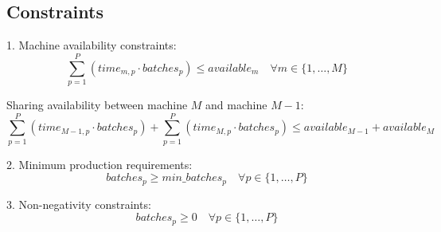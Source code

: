 \documentclass{article}
\begin{document}
\subsection*{Constraints}
1. Machine availability constraints:
\[
\sum_{p=1}^{P} (time_{m,p} \cdot batches_{p}) \leq available_{m} \quad \forall m \in \{1, \ldots, M\}
\]

\item Sharing availability between machine \( M \) and machine \( M-1 \):
\[
\sum_{p=1}^{P} (time_{M-1,p} \cdot batches_{p}) + \sum_{p=1}^{P} (time_{M,p} \cdot batches_{p}) \leq available_{M-1} + available_{M}
\]

2. Minimum production requirements:
\[
batches_{p} \geq min\_batches_{p} \quad \forall p \in \{1, \ldots, P\}
\]

3. Non-negativity constraints:
\[
batches_{p} \geq 0 \quad \forall p \in \{1, \ldots, P\}
\]
\end{document}
